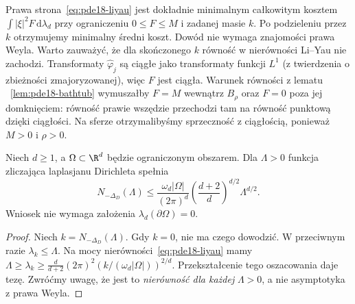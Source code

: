 \begin{uwaga}
Prawa strona~\eqref{eq:pde18-liyau} jest dokładnie
minimalnym całkowitym kosztem $\int |\xi|^2F\,\mathrm d\lambda_d$
przy ograniczeniu $0\le F\le M$ i zadanej masie $k$.
Po podzieleniu przez $k$ otrzymujemy minimalny średni koszt.
Dowód nie wymaga znajomości prawa Weyla.
Warto zauważyć, że dla skończonego $k$ równość
w nierówności Li--Yau nie zachodzi. Transformaty
$\widehat\varphi_j$ są ciągłe jako transformaty funkcji
$L^1$ (z twierdzenia o zbieżności zmajoryzowanej),
więc $F$ jest ciągła. Warunek równości z lematu
~\ref{lem:pde18-bathtub} wymuszałby
$F=M$ wewnątrz $B_\rho$ oraz $F=0$ poza jej domknięciem:
równość prawie wszędzie przechodzi tam na równość
punktową dzięki ciągłości. Na sferze otrzymalibyśmy
sprzeczność z ciągłością, ponieważ $M>0$ i $\rho>0$.
\end{uwaga}


\begin{wniosek}
\label{cor:pde18-count-liyau}
Niech $d\ge1$, a $\Omega\subset\R^d$ będzie ograniczonym
obszarem. Dla $\Lambda>0$ funkcja zliczająca laplasjanu
Dirichleta spełnia
\[
 N_{-\Delta_D}(\Lambda)\le
 \frac{\omega_d|\Omega|}{(2\pi)^d}
 \left(\frac{d+2}{d}\right)^{d/2}\Lambda^{d/2}.
\]
Wniosek nie wymaga założenia $\lambda_d(\partial\Omega)=0$.
\end{wniosek}
\begin{proof}
Niech $k=N_{-\Delta_D}(\Lambda)$. Gdy $k=0$, nie ma
czego dowodzić. W przeciwnym razie $\lambda_k\le\Lambda$.
Na mocy nierówności~\eqref{eq:pde18-liyau} mamy
$\Lambda\ge\lambda_k\ge\frac d{d+2}(2\pi)^2
(k/(\omega_d|\Omega|))^{2/d}$. Przekształcenie tego
oszacowania daje tezę. Zwróćmy uwagę, że jest to
\emph{nierówność dla każdej} $\Lambda>0$, a nie
asymptotyka z prawa Weyla.
\end{proof}

